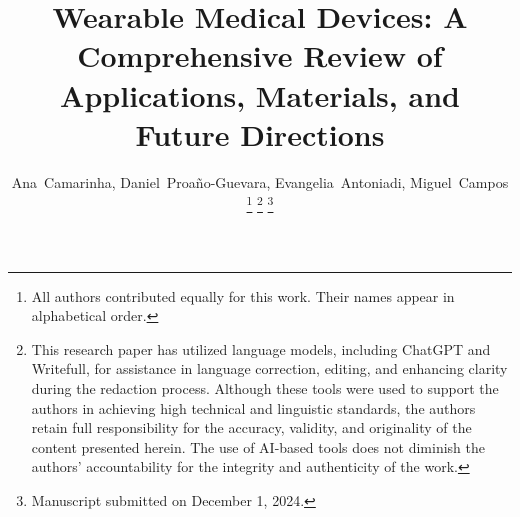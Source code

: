 \documentclass[journal]{IEEEtran}
\begin{document}
%
\title{Wearable Medical Devices: A Comprehensive Review of Applications, Materials, and Future Directions}
%
%
%

\author{Ana~Camarinha,
        Daniel~Proaño-Guevara,
        Evangelia~Antoniadi,
        Miguel~Campos%

\thanks{All authors contributed equally for this work. Their names appear in alphabetical order.}%
\thanks{This research paper has utilized language models, including ChatGPT and Writefull, for assistance in language correction, editing, and enhancing clarity during the redaction process. Although these tools were used to support the authors in achieving high technical and linguistic standards, the authors retain full responsibility for the accuracy, validity, and originality of the content presented herein. The use of AI-based tools does not diminish the authors’ accountability for the integrity and authenticity of the work.}%
\thanks{Manuscript submitted on December 1, 2024.}}

% 
%
\end{document}
